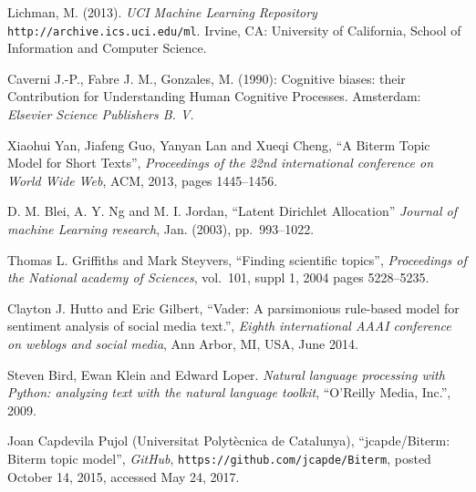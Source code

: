 \documentclass[final]{ieee}
\begin{document}
\begin{thebibliography}{99}
   Lichman, M. (2013). {\it UCI Machine Learning Repository} \texttt{http://archive.ics.uci.edu/ml}. Irvine, CA: University of California, School of Information and Computer Science.

   Caverni J.-P., Fabre J. M., Gonzales, M. (1990): Cognitive biases: their Contribution for Understanding Human Cognitive Processes. Amsterdam: {\it Elsevier Science Publishers B. V.}

   Xiaohui Yan, Jiafeng Guo, Yanyan Lan and Xueqi Cheng, 
   ``A Biterm Topic Model for Short Texts'', {\it Proceedings of the 22nd international conference on 
   World Wide Web}, ACM, 2013, pages 1445--1456.

   D. M. Blei, A. Y. Ng and M. I. Jordan, ``Latent Dirichlet Allocation'' {\it Journal of machine Learning research},  Jan. (2003), pp.~993--1022.
   
    Thomas L. Griffiths and Mark Steyvers, 
   ``Finding scientific topics'', {\it Proceedings of the National academy of Sciences}, vol.~101, suppl 1, 2004 pages 5228--5235.
   
    Clayton J. Hutto and Eric Gilbert, 
   ``Vader: A parsimonious rule-based model for sentiment analysis of social media text.'', {\it  Eighth international AAAI conference on weblogs and social media}, Ann Arbor, MI, USA, June 2014.
   
    Steven Bird, Ewan Klein and Edward Loper. {\it Natural language processing with Python: analyzing text with the natural language toolkit}, ``O'Reilly Media, Inc.'', 2009.
   
    Joan Capdevila Pujol (Universitat Polyt\`{e}cnica de Catalunya), ``jcapde/Biterm: Biterm topic model'', {\it GitHub}, \texttt{https://github.com/jcapde/Biterm}, posted October 14, 2015, accessed May 24, 2017.


  
    
  

\end{thebibliography}
\end{document}
